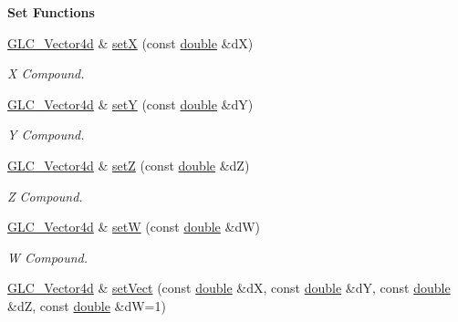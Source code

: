 \begin{Indent}{\bf Set Functions}\par
\begin{DoxyCompactItemize}
\item 
\hyperlink{class_g_l_c___vector4d}{G\-L\-C\-\_\-\-Vector4d} \& \hyperlink{class_g_l_c___vector4d_aa0c30c31e8bdc2e5c26f7c1a525df5b2}{set\-X} (const \hyperlink{_super_l_u_support_8h_a8956b2b9f49bf918deed98379d159ca7}{double} \&d\-X)
\begin{DoxyCompactList}\small\item\em X Compound. \end{DoxyCompactList}\item 
\hyperlink{class_g_l_c___vector4d}{G\-L\-C\-\_\-\-Vector4d} \& \hyperlink{class_g_l_c___vector4d_aa31085f0770b174a58b068ea82119e36}{set\-Y} (const \hyperlink{_super_l_u_support_8h_a8956b2b9f49bf918deed98379d159ca7}{double} \&d\-Y)
\begin{DoxyCompactList}\small\item\em Y Compound. \end{DoxyCompactList}\item 
\hyperlink{class_g_l_c___vector4d}{G\-L\-C\-\_\-\-Vector4d} \& \hyperlink{class_g_l_c___vector4d_aa855c6ce8c573dafd259078b40a58b7a}{set\-Z} (const \hyperlink{_super_l_u_support_8h_a8956b2b9f49bf918deed98379d159ca7}{double} \&d\-Z)
\begin{DoxyCompactList}\small\item\em Z Compound. \end{DoxyCompactList}\item 
\hyperlink{class_g_l_c___vector4d}{G\-L\-C\-\_\-\-Vector4d} \& \hyperlink{class_g_l_c___vector4d_a180e87e75dd3111e1f611de14a9e34c4}{set\-W} (const \hyperlink{_super_l_u_support_8h_a8956b2b9f49bf918deed98379d159ca7}{double} \&d\-W)
\begin{DoxyCompactList}\small\item\em W Compound. \end{DoxyCompactList}\item 
\hyperlink{class_g_l_c___vector4d}{G\-L\-C\-\_\-\-Vector4d} \& \hyperlink{class_g_l_c___vector4d_a813dd82f87e6ca16f1c69a791ea35318}{set\-Vect} (const \hyperlink{_super_l_u_support_8h_a8956b2b9f49bf918deed98379d159ca7}{double} \&d\-X, const \hyperlink{_super_l_u_support_8h_a8956b2b9f49bf918deed98379d159ca7}{double} \&d\-Y, const \hyperlink{_super_l_u_support_8h_a8956b2b9f49bf918deed98379d159ca7}{double} \&d\-Z, const \hyperlink{_super_l_u_support_8h_a8956b2b9f49bf918deed98379d159ca7}{double} \&d\-W=1)

\end{DoxyCompactItemize}
\end{Indent}
